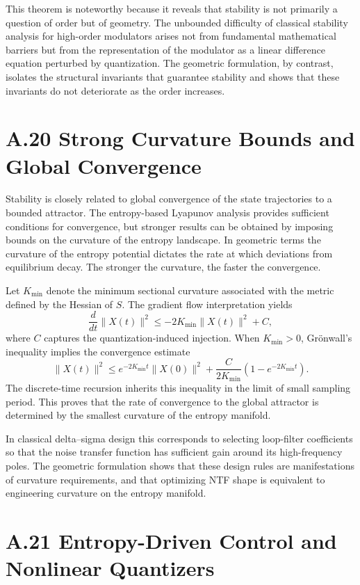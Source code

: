 This theorem is noteworthy because it reveals that stability is not primarily a question of order but of geometry. The unbounded difficulty of classical stability analysis for high-order modulators arises not from fundamental mathematical barriers but from the representation of the modulator as a linear difference equation perturbed by quantization. The geometric formulation, by contrast, isolates the structural invariants that guarantee stability and shows that these invariants do not deteriorate as the order increases.

\section{A.20 Strong Curvature Bounds and Global Convergence}

Stability is closely related to global convergence of the state trajectories to a bounded attractor. The entropy-based Lyapunov analysis provides sufficient conditions for convergence, but stronger results can be obtained by imposing bounds on the curvature of the entropy landscape. In geometric terms the curvature of the entropy potential dictates the rate at which deviations from equilibrium decay. The stronger the curvature, the faster the convergence.

Let \(K_{\min}\) denote the minimum sectional curvature associated with the metric defined by the Hessian of \(S\). The gradient flow interpretation yields
\[
\frac{d}{dt}\|X(t)\|^2 \le - 2 K_{\min} \|X(t)\|^2 + C,
\]
where \(C\) captures the quantization-induced injection. When \(K_{\min}>0\), Grönwall’s inequality implies the convergence estimate
\[
\|X(t)\|^2 \le e^{-2K_{\min} t} \|X(0)\|^2 + \frac{C}{2K_{\min}} \left(1 - e^{-2K_{\min} t}\right).
\]
The discrete-time recursion inherits this inequality in the limit of small sampling period. This proves that the rate of convergence to the global attractor is determined by the smallest curvature of the entropy manifold.

In classical delta–sigma design this corresponds to selecting loop-filter coefficients so that the noise transfer function has sufficient gain around its high-frequency poles. The geometric formulation shows that these design rules are manifestations of curvature requirements, and that optimizing NTF shape is equivalent to engineering curvature on the entropy manifold.

\section{A.21 Entropy-Driven Control and Nonlinear Quantizers}

